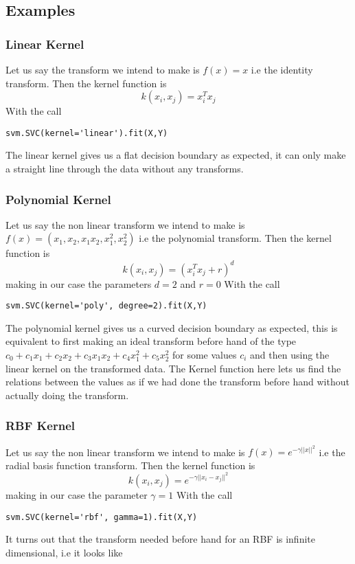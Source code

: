 \documentclass[hidelinks]{book}
\numberwithin{equation}{section}
\begin{document}
\subsection{Examples}
\subsubsection{Linear Kernel}
Let us say the transform we intend to make is $f(x) = x$ i.e the identity
transform. Then the kernel function is
 $$ k(x_i, x_j) = x_i^T x_j $$ With the call
\begin{verbatim}
svm.SVC(kernel='linear').fit(X,Y)
\end{verbatim}
The linear kernel gives us a flat decision boundary as expected, it can only
make a straight line through the data without any transforms.

\subsubsection{Polynomial Kernel}
Let us say the non linear transform we intend to make is $f(x) = (x_1, x_2,
x_1x_2, x_1^2 ,x_2^2)$ i.e the polynomial transform. Then the kernel function
is $$k(x_i, x_j) = (x_i^T x_j + r)^d $$ making in our case the parameters
$d = 2$ and $r = 0$ With the call
\begin{verbatim}
svm.SVC(kernel='poly', degree=2).fit(X,Y)
\end{verbatim}
The polynomial kernel gives us a curved decision boundary as expected, this
is equivalent to first making an ideal transform before hand of the type
$c_0 + c_1x_1 + c_2x_2 + c_3x_1x_2 + c_4x_1^2 + c_5x_2^2$ for some values
$c_i$ and then using the linear kernel on the transformed data. The Kernel
function here lets us find the relations between the values as if we had
done the transform before hand without actually doing the transform.

\subsubsection{RBF Kernel}
Let us say the non linear transform we intend to make is $f(x) = e^{-\gamma
||x||^2}$ i.e the radial basis function transform. Then the kernel function
is $$k(x_i, x_j) = e^{-\gamma ||x_i - x_j||^2} $$ making in our case the
parameter $\gamma = 1$ With the call
\begin{verbatim}
svm.SVC(kernel='rbf', gamma=1).fit(X,Y)
\end{verbatim}
It turns out that the transform needed before hand for an RBF is infinite
dimensional, i.e it looks like
\end{document}
